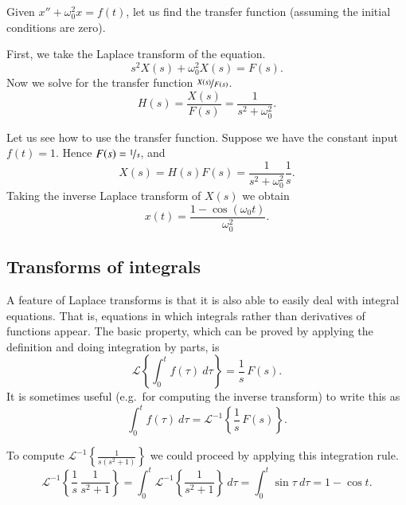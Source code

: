 \documentclass[12pt]{book}
\begin{document}
\begin{example}
Given $x'' + \omega_0^2 x = f(t)$, let us find the transfer function
(assuming the initial conditions are zero).

First, we take the Laplace transform of the equation.
\begin{equation*}
s^2 X(s) + \omega_0^2 X(s) = F(s) .
\end{equation*}
Now we solve for the transfer function $\nicefrac{X(s)}{F(s)}$.
\begin{equation*}
H(s) = \frac{X(s)}{F(s)} = \frac{1}{s^2 + \omega_0^2} .
\end{equation*}

Let us see how to use the transfer function.  Suppose we have the constant input
$f(t) = 1$.  Hence $F(s) = \nicefrac{1}{s}$, and
\begin{equation*}
X(s) = H(s) F(s) = \frac{1}{s^2+\omega_0^2} \frac{1}{s} .
\end{equation*}
Taking the inverse Laplace transform of $X(s)$ we obtain
\begin{equation*}
x(t) = \frac{1-\cos(\omega_0 t)}{\omega_0^2} .
\end{equation*}
\end{example}

\subsection{Transforms of integrals}

A feature of Laplace transforms is that it is also able to easily deal
with integral equations.  That is, equations in which integrals rather than
derivatives of functions appear.  The basic property, which can be proved
by applying the definition and doing integration by parts, is 
\begin{equation*}
\boxed{~~
\mathcal{L} \left\{
\int_0^t f(\tau) ~ d\tau
\right\} = \frac{1}{s} \, F(s) .
~~}
\end{equation*}
It is sometimes useful (e.g.\ for computing the inverse transform) to write
this as
\begin{equation*}
\int_0^t f(\tau) ~ d\tau
=
{\mathcal{L}}^{-1} \left\{
\frac{1}{s} \, F(s) \right\} .
\end{equation*}

\begin{example}
To compute ${\mathcal{L}}^{-1} \left\{\frac{1}{s(s^2+1)}\right\}$ we could
proceed by applying this integration rule.  
\begin{equation*}
{\mathcal{L}}^{-1} \left\{
\frac{1}{s} \, \frac{1}{s^2+1} \right\} 
=
\int_0^t 
{\mathcal{L}}^{-1} \left\{
\frac{1}{s^2+1} \right\} ~ d\tau
=
\int_0^t 
\sin \tau ~ d\tau
=
1 - \cos t .
\end{equation*}
\end{example}
\end{document}
